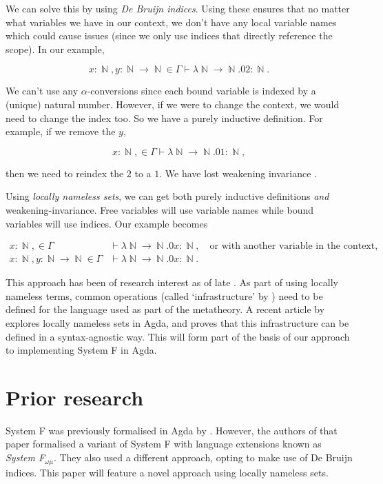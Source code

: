 \documentclass[logo,bsc,singlespacing,parskip,online]{infthesis}
\DeclareMathOperator{\nat}{\mathbb{N}}
\begin{document}
We can solve this by using \textit{De Bruijn indices}. Using these ensures that
no matter what variables we have in our context, we don't have any local
variable names which could cause issues (since we only use indices that directly
reference the scope). In our example,

\begin{equation*}
  x \colon \nat, y \colon \nat \to \nat \in \Gamma \vdash \lambda \nat \to \nat. 0 2 \colon \nat.
\end{equation*}

We can't use any $\alpha$-conversions since each bound variable is indexed by a
(unique) natural number. However, if we were to change the context, we would
need to change the index too. So we have a purely inductive definition. For
example, if we remove the $y$,

\begin{equation*}
  x \colon \nat, \in \Gamma \vdash \lambda \nat \to \nat. 0 1 \colon \nat,
\end{equation*}

then we need to reindex the $2$ to a $1$. We have lost weakening invariance
\citep{aydemir_engineering_2008}.

Using \textit{locally nameless sets}, we can get both purely inductive
definitions \textit{and} weakening-invariance. Free variables will use variable
names while bound variables will use indices. Our example becomes

\begin{align*}
  x \colon \nat, \in \Gamma &\vdash \lambda \nat \to \nat. 0 x \colon \nat,\quad \text{or with another variable in the context,}\\
  x \colon \nat, y \colon \nat \to \nat \in \Gamma &\vdash \lambda \nat \to \nat. 0 x \colon \nat.
\end{align*}

This approach has been of research interest as of late
\citep{aydemir_engineering_2008} \citep{chargueraud_locally_2012}. As part of
using locally nameless terms, common operations (called `infrastructure' by
\citet{aydemir_engineering_2008}) need to be defined for the language used as
part of the metatheory. A recent article by \citet{pitts_locally_2023} explores
locally nameless sets in Agda, and proves that this infrastructure can be
defined in a syntax-agnostic way. This will form part of the basis of our
approach to implementing System F in Agda.

\section{Prior research}
System F was previously formalised in Agda by \citet{hutton_system_2019}.
However, the authors of that paper formalised a variant of System F with
language extensions known as \textit{System F$_{\omega \mu}$}. They also used a
different approach, opting to make use of De Bruijn indices. This paper will
feature a novel approach using locally nameless sets.
\end{document}
